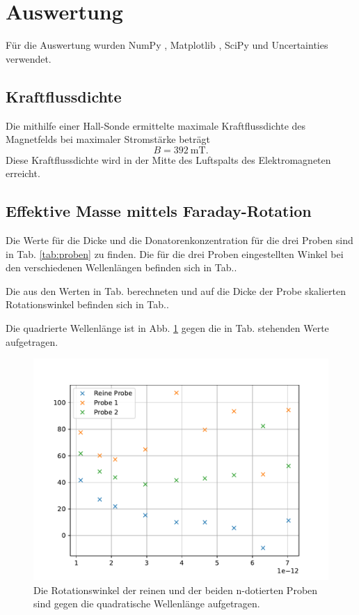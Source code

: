 \section{Auswertung}
\label{sec:Auswertung}
Für die Auswertung wurden NumPy \cite{numpy}, Matplotlib \cite{matplotlib}, SciPy \cite{scipy} und Uncertainties \cite{uncertainties} verwendet.

\subsection{Kraftflussdichte}
Die mithilfe einer Hall-Sonde ermittelte maximale Kraftflussdichte des Magnetfelds bei maximaler Stromstärke beträgt
\begin{equation*}
    B = \SI{392}{\milli\tesla}.
\end{equation*}
Diese Kraftflussdichte wird in der Mitte des Luftspalts des Elektromagneten erreicht.

\subsection{Effektive Masse mittels Faraday-Rotation}
Die Werte für die Dicke und die Donatorenkonzentration für die drei Proben sind in Tab. \ref{tab:proben} zu finden.
Die für die drei Proben eingestellten Winkel bei den verschiedenen Wellenlängen befinden sich in Tab..


%

Die aus den Werten in Tab. berechneten und auf die Dicke der Probe skalierten Rotationswinkel befinden sich in Tab..


Die quadrierte Wellenlänge ist in Abb. \ref{fig:alle} gegen die in Tab. stehenden Werte aufgetragen.
\begin{figure}
    \centering
    \includegraphics[width=15cm]{plots/AlleProben.pdf}
    \caption{Die Rotationswinkel der reinen und der beiden n-dotierten Proben sind gegen die quadratische Wellenlänge aufgetragen.}
    \label{fig:alle}
\end{figure}

